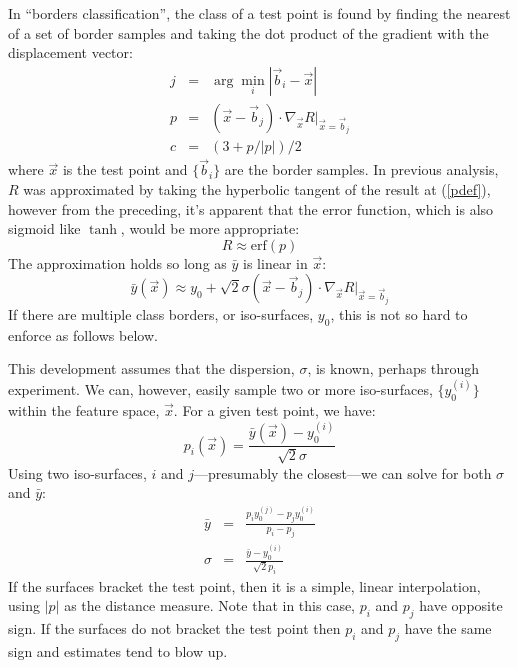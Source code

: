 In ``borders classification'', the class of a test point is found by finding
the nearest of a set of border samples and taking the dot product of the
gradient with the displacement vector:
\begin{eqnarray}
j & = & \arg \min_i |\vec b_i - \vec x| \\
p & = & (\vec x - \vec b_j) \cdot \nabla_{\vec x} R |_{\vec x=\vec b_j} 
\label{pdef} \\
c & = & (3+p/|p|)/2
\end{eqnarray}
where $\vec x$ is the test point and $\lbrace \vec b_i \rbrace$ are the border
samples.  
In previous analysis, $R$ was approximated by taking the hyperbolic tangent of
the result at (\ref{pdef}), however from the preceding, it's apparent that the
error function, which is also sigmoid like $\tanh$, 
would be more appropriate:
\begin{equation}
R \approx \mathrm{erf}(p)
\end{equation}
The approximation holds so long as
$\bar y$ is linear in $\vec x$:
\begin{equation}
\bar y(\vec x) \approx y_0 + \sqrt 2 \sigma (\vec x - \vec b_j) \cdot \nabla_{\vec x} R |_{\vec x=\vec b_j}
\end{equation}
If there are multiple class borders, or iso-surfaces, $y_0$, this is not so
hard to enforce as follows below.

This development assumes that the dispersion, $\sigma$, is known,
perhaps through experiment.
We can, however, easily sample two or more iso-surfaces, 
$\lbrace y_0^{(i)} \rbrace$
within the feature space, $\vec x$.  For a given test point, we have:
\begin{equation}
p_i(\vec x) = \frac{\bar y(\vec x) - y_0^{(i)}}{\sqrt 2 \sigma}
\label{baryandp}
\end{equation}
Using two iso-surfaces, 
$i$ and $j$---presumably the closest---we can solve for both
$\sigma$ and $\bar y$:
\begin{eqnarray}
\bar y & = & \frac{p_i y_0^{(j)} - p_j y_0^{(i)}}{p_i - p_j} \\
\sigma & = & \frac{\bar y - y_0^{(i)}}{\sqrt 2 p_i}
\end{eqnarray}
If the surfaces bracket the test point, then it is a simple, linear
interpolation, using $|p|$ as the distance measure. 
Note that in this case, $p_i$ and $p_j$ have opposite sign.
If the surfaces do not
bracket the test point
then $p_i$ and $p_j$ have the same sign and estimates tend to
blow up.

